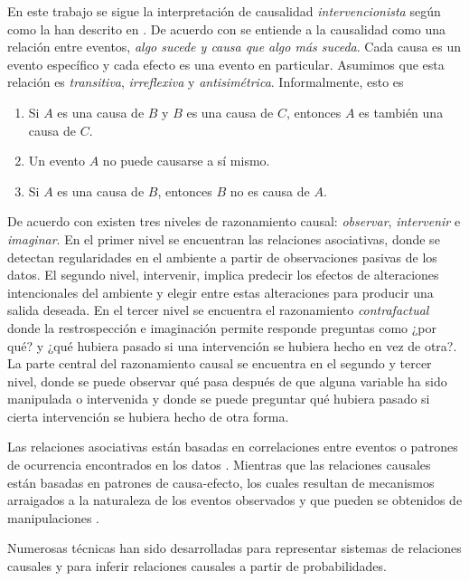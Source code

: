 En este trabajo se sigue la interpretación de causalidad  
\textit{intervencionista} según como la han descrito en \cite{woodward2005making}\cite{spirtes2000causation}\cite{pearl_2009}.
De acuerdo con \cite{spirtes2000causation} se entiende a la causalidad 
como una relación entre eventos, \textit{algo sucede y causa que algo más suceda}. Cada causa es un evento específico y cada efecto es una evento
en particular. Asumimos que esta relación es \textit{transitiva}, \textit{irreflexiva} y \textit{antisimétrica}. Informalmente, esto es 
\begin{enumerate}
    \item Si $A$ es una causa de $B$ y $B$ es una causa de $C$, entonces
    $A$ es también una causa de $C$.
    \item Un evento $A$ no puede causarse a sí mismo.
    \item Si $A$ es una causa de $B$, entonces $B$ no es causa de $A$.
\end{enumerate}


De acuerdo con \cite{pearl2018bookofwhy} existen tres niveles
de razonamiento causal: \textit{observar}, \textit{intervenir}
e \textit{imaginar}.
En el primer nivel se encuentran las 
relaciones asociativas, donde se detectan regularidades
en el ambiente a partir de observaciones pasivas de los datos.
El segundo nivel, intervenir, implica predecir los 
efectos de alteraciones intencionales del ambiente
y elegir entre estas alteraciones  para producir una
salida deseada. En el tercer nivel se encuentra
el razonamiento \textit{contrafactual} donde la restrospección
e imaginación permite responde preguntas como ¿por qué?
y ¿qué hubiera pasado si una intervención se hubiera hecho 
en vez de otra?.
La parte central del razonamiento causal se encuentra en el segundo
y tercer nivel, donde se puede observar qué pasa después de que 
alguna variable ha sido manipulada o intervenida y donde se puede
preguntar qué hubiera pasado si cierta intervención se hubiera 
hecho de otra forma.

Las relaciones asociativas están basadas en correlaciones
entre eventos o patrones de ocurrencia encontrados en los
datos \cite{pearl2018bookofwhy}. Mientras que las relaciones
causales están basadas en patrones de causa-efecto,
los cuales resultan de mecanismos arraigados a la naturaleza
de los eventos observados y que pueden se obtenidos de 
manipulaciones \cite{sep-causal-models}.

Numerosas técnicas han sido desarrolladas para representar
sistemas de relaciones causales y para inferir 
relaciones causales a partir de probabilidades. 

